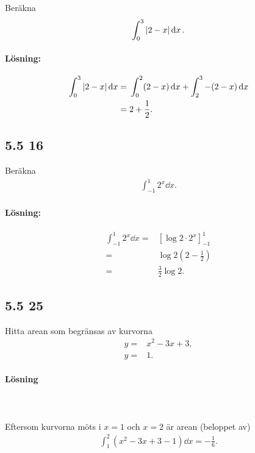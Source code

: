 Beräkna
\begin{align*}
	\int_0^3 \abs{2 - x} \dd{x}.
\end{align*}

\paragraph{Lösning:}

\begin{align*}
	\int_0^3 \abs{2 - x} \dd{x} ={}& \int_0^2 (2 - x) \dd{x} + \int_2^3 -(2 - x) \dd{x}\\
	={}& 2 + \frac{1}{2}.
\end{align*}


\subsection{5.5 16}%
\label{sub:5_5_16}

Beräkna
\begin{align*}
	\int_{-1}^1 2^x \dd{x}.
\end{align*}

\paragraph{Lösning:}

\begin{align*}
	\int_{-1}^1 2^x \dd{x} ={}& \left[\log{2} \cdot 2^x\right]_{-1}^1\\
	={}& \log{2}(2 - \frac{1}{2})\\
	={}& \frac{3}{2} \log{2}.
\end{align*}


\subsection{5.5 25}%
\label{sub:5_5_25}

Hitta arean som begränsas av kurvorna
\begin{align*}
	y ={}& x^2 - 3 x + 3,\\
	y ={}& 1.
\end{align*}

\paragraph{Lösning}

\\
\\
Eftersom kurvorna möts i $x = 1$ och $x = 2$ är arean (beloppet av)
\begin{align*}
	\int_1^2 (x^2 - 3 x + 3 - 1) \dd{x} = -\frac{1}{6}.
\end{align*}

